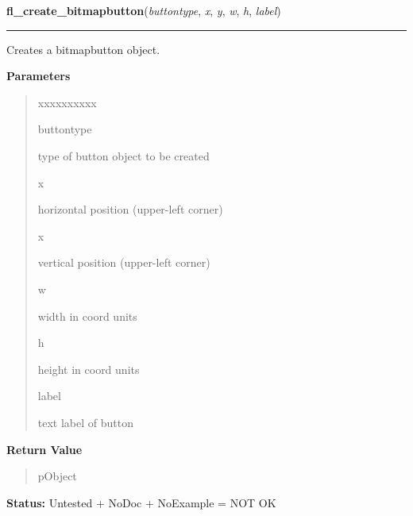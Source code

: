     \label{xformslib:library:fl_create_bitmapbutton}

    \vspace{0.5ex}

\hspace{.8\funcindent}\begin{boxedminipage}{\funcwidth}

    \raggedright \textbf{fl\_create\_bitmapbutton}(\textit{buttontype}, \textit{x}, \textit{y}, \textit{w}, \textit{h}, \textit{label})

    \vspace{-1.5ex}

    \rule{\textwidth}{0.5\fboxrule}
\setlength{\parskip}{2ex}
    Creates a bitmapbutton object.

\setlength{\parskip}{1ex}
      \textbf{Parameters}
      \vspace{-1ex}

      \begin{quote}
        \begin{Ventry}{xxxxxxxxxx}

          \item[buttontype]

          type of button object to be created

          \item[x]

          horizontal position (upper-left corner)

          \item[x]

          vertical position (upper-left corner)

          \item[w]

          width in coord units

          \item[h]

          height in coord units

          \item[label]

          text label of button

        \end{Ventry}

      \end{quote}

      \textbf{Return Value}
    \vspace{-1ex}

      \begin{quote}
      pObject

      \end{quote}

\textbf{Status:} Untested + NoDoc + NoExample = NOT OK



    \end{boxedminipage}


